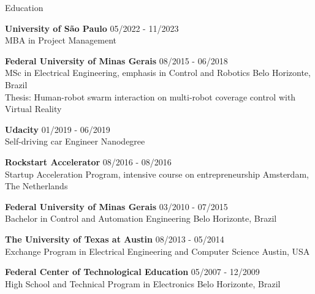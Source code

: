\documentclass[14pt, a4paper]{resume} %
\begin{document}


\begin{rSection}{Education}

{\bf University of São Paulo}  \hfill{05/2022 - 11/2023} \\ 
MBA in Project  Management 

{\bf Federal University of Minas Gerais}  \hfill{08/2015 - 06/2018} \\ 
MSc in Electrical Engineering, emphasis in Control and Robotics \hfill{Belo Horizonte, Brazil} \\
Thesis: Human-robot swarm interaction on multi-robot coverage control with Virtual Reality 

{\bf Udacity}  \hfill{01/2019 - 06/2019} \\ 
Self-driving car Engineer Nanodegree

{\bf Rockstart Accelerator}  \hfill{08/2016 - 08/2016} \\ 
Startup Acceleration Program, intensive course on entrepreneurship \hfill{Amsterdam, The Netherlands} 

{\bf Federal University of Minas Gerais}  \hfill{03/2010 - 07/2015} \\ 
Bachelor in Control and Automation Engineering \hfill{Belo Horizonte, Brazil}

{\bf The University of Texas at Austin} \hfill {08/2013 - 05/2014} \\ 
Exchange Program in Electrical Engineering and Computer Science \hfill {Austin, USA}

{\bf Federal Center of Technological Education} \hfill {05/2007 - 12/2009} \\ 
High School and Technical Program in Electronics \hfill{Belo Horizonte, Brazil}

\end{rSection}

\end{document}
